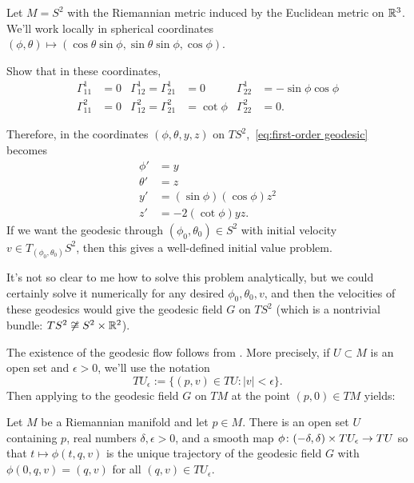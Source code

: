 \begin{example}
	Let $M = S^2$ with the Riemannian metric induced by the Euclidean metric on $\mathbb{R}^3$. We'll work locally in spherical coordinates $(\phi,\theta) \mapsto (\cos \theta \sin \phi, \sin \theta \sin \phi, \cos \phi)$. 
	
	\begin{exercise}
		Show that in these coordinates,
		\begin{align*}
			\Gamma_{11}^1 & = 0 & \Gamma_{12}^1 = \Gamma_{21}^1 & = 0 &  \Gamma_{22}^1 & = -\sin \phi \cos \phi \\
			\Gamma_{11}^2 & = 0 & \Gamma_{12}^2 = \Gamma_{21}^2 & = \cot \phi & \Gamma_{22}^2 & = 0.
		\end{align*}
	\end{exercise}
	
	Therefore, in the coordinates $(\phi, \theta, y, z)$ on $TS^2$,~\eqref{eq:first-order geodesic} becomes
	\begin{align*}
		\phi' & = y \\
		\theta' & = z \\
		y' & = (\sin \phi) (\cos \phi) z^2 \\
		z' & = - 2(\cot \phi) y z.
	\end{align*}
	If we want the geodesic through $(\phi_0,\theta_0) \in S^2$ with initial velocity $v \in T_{(\phi_0,\theta_0)}S^2$, then this gives a well-defined initial value problem.
	
	It's not so clear to me how to solve this problem analytically, but we could certainly solve it numerically for any desired $\phi_0,\theta_0,v$, and then the velocities of these geodesics would give the geodesic field $G$ on $TS^2$ (which is a nontrivial bundle: $TS^2 \not\cong S^2 \times \mathbb{R}^2$).
\end{example}

The existence of the geodesic flow follows from . More precisely, if $U \subset M$ is an open set and $\epsilon > 0$, we'll use the notation
\[
	TU_\epsilon := \{(p,v) \in TU : |v|<\epsilon\}.
\]
Then applying  to the geodesic field $G$ on $TM$ at the point $(p,0) \in TM$ yields:
\begin{proposition}\label{prop:geodesic flow}
	Let $M$ be a Riemannian manifold and let $p \in M$. There is an open set $U$ containing $p$, real numbers $\delta,\epsilon > 0$, and a smooth map $\phi \colon\thinspace\! (-\delta, \delta) \times TU_\epsilon \to TU$ so that $t \mapsto \phi(t,q,v)$ is the unique trajectory of the geodesic field $G$ with $\phi(0,q,v) = (q,v)$ for all $(q,v) \in TU_\epsilon$.
\end{proposition}

